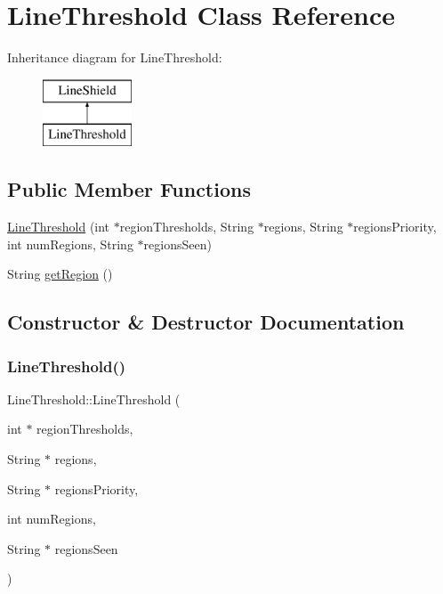 \hypertarget{class_line_threshold}{}\section{Line\+Threshold Class Reference}
\label{class_line_threshold}
Inheritance diagram for Line\+Threshold\+:\begin{figure}[H]
\begin{center}
\leavevmode
\includegraphics[height=2.000000cm]{class_line_threshold}
\end{center}
\end{figure}
\subsection*{Public Member Functions}
\begin{DoxyCompactItemize}
\item 
\mbox{\hyperlink{class_line_threshold_a927e9c11dcec815c2e64d6ea7202c3fb}{Line\+Threshold}} (int $\ast$region\+Thresholds, String $\ast$regions, String $\ast$regions\+Priority, int num\+Regions, String $\ast$regions\+Seen)
\item 
String \mbox{\hyperlink{class_line_threshold_a57c6827535c3cd2611f93f7e52e3ec95}{get\+Region}} ()
\end{DoxyCompactItemize}


\subsection{Constructor \& Destructor Documentation}
\mbox{\label{class_line_threshold_a927e9c11dcec815c2e64d6ea7202c3fb}} 
\subsubsection{\texorpdfstring{Line\+Threshold()}{LineThreshold()}}
{\footnotesize\ttfamily Line\+Threshold\+::\+Line\+Threshold (\begin{DoxyParamCaption}\item[{int $\ast$}]{region\+Thresholds,  }\item[{String $\ast$}]{regions,  }\item[{String $\ast$}]{regions\+Priority,  }\item[{int}]{num\+Regions,  }\item[{String $\ast$}]{regions\+Seen }\end{DoxyParamCaption})}

